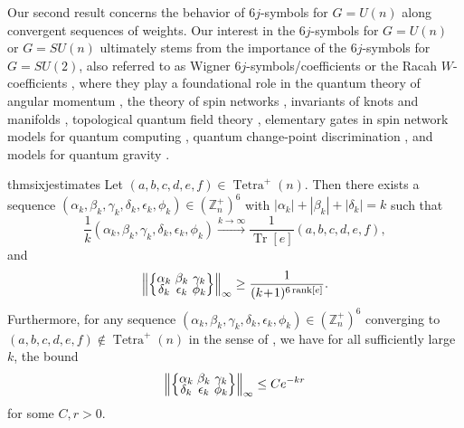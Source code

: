 \documentclass[pdflatex, sn-mathphys-num]{sn-jnl} %
\theoremstyle{plain}
\theoremstyle{definition}
\let\cref\crtcref
\DeclareMathOperator{\Tr}{Tr}
\DeclareMathOperator{\Tetra}{Tetra}
\DeclareMathOperator{\rank}{rank}
\newcommand{\polyk}[1]{(k\!+\!1)^{#1}}
\newcommand{\norm}[1]{\left\lVert#1\right\rVert}
\newcommand{\abs}[1]{\left|#1\right|}
\newcommand{\undomweightsp}[1]{\mathbb Z^{+}_{#1}}
\newcommand{\ea}{a}
\newcommand{\eb}{b}
\newcommand{\ec}{c}
\newcommand{\ed}{d}
\newcommand{\ee}{e}
\newcommand{\ef}{f}
\newcommand{\ya}{\alpha}
\newcommand{\yb}{\beta}
\newcommand{\yc}{\gamma}
\newcommand{\yd}{\delta}
\newcommand{\ye}{\epsilon}
\newcommand{\yf}{\phi}
\newcommand{\tightcurlysixj}[1]{
\begingroup
\arraycolsep=1.5pt
\renewcommand{\arraystretch}{0.3}
\left\{\!\begin{array}{ccc}
    #1
\end{array}\!\right\}
\endgroup
}
\begin{document}
Our second result concerns the behavior of $6j$-symbols for $G=U(n)$ along convergent sequences of weights.
Our interest in the $6j$-symbols for $G=U(n)$ or $G=SU(n)$ ultimately stems from the importance of the $6j$-symbols for $G=SU(2)$, also referred to as Wigner $6j$-symbols/coefficients \cite{wigner1993matrices} or the Racah $W$-coefficients \cite{racah1942theory},
where they play a foundational role in the quantum theory of angular momentum \cite{varshalovich1988quantum,edmonds1996angular,aquilanti2012semiclassical}, the theory of spin networks \cite{penrose1971applications, baez2010physics, baez1996spin}, invariants of knots and manifolds \cite{reshetikhin1987quantized, turaev1992state}, topological quantum field theory \cite{durhuus1993topological}, elementary gates in spin network models for quantum computing \cite{marzuoli2005computing}, quantum change-point discrimination \cite{akimoto2011discrimination}, and models for quantum gravity \cite{baez1999introduction,barrett1998relativistic,barrett2003geometrical,rovelli2004quantum,moussouris1984quantum}.
\begin{restatable}{thm}{sixjestimates}
    \label{thm:6j_estimates}
    Let $(\ea, \eb, \ec, \ed, \ee, \ef) \in \Tetra^+(n)$.
    Then there exists a sequence
    $(\ya_k, \yb_k, \yc_k, \yd_k, \ye_k, \yf_k) \in (\undomweightsp{n})^6$ with $\abs{\ya_k}+\abs{\yb_k}+\abs{\yd_k} = k$ such that
    \begin{equation}
        \label{eq:young_diagram_convergence}
        \frac{1}{k} (\ya_k, \yb_k, \yc_k, \yd_k, \ye_k, \yf_k)
        \stackrel{k \to \infty}{\longrightarrow}
        \frac{1}{\Tr[e]} (\ea, \eb, \ec, \ed, \ee, \ef),
    \end{equation}
    and
    \begin{equation}
        \label{eq:n_independent_inverse_poly}
        \norm{\tightcurlysixj{ \ya_k & \yb_k & \yc_k \\ \yd_k &  \ye_k &  \yf_k}}_{\infty} \geq \frac{1}{\polyk{6\rank[\ee]}}.
    \end{equation}
    Furthermore, for any sequence $(\ya_k, \yb_k, \yc_k, \yd_k, \ye_k, \yf_k) \in (\undomweightsp{n})^6$ converging to $(\ea, \eb, \ec, \ed, \ee, \ef) \not \in \Tetra^{+}(n)$ in the sense of \cref{eq:young_diagram_convergence}, we have for all sufficiently large $k$, the bound
    \begin{equation}
        \norm{\tightcurlysixj{ \ya_k & \yb_k & \yc_k \\ \yd_k &  \ye_k &  \yf_k}}_{\infty} \leq C e^{-kr}
    \end{equation}
    for some $C, r > 0$.
\end{restatable}
\end{document}
